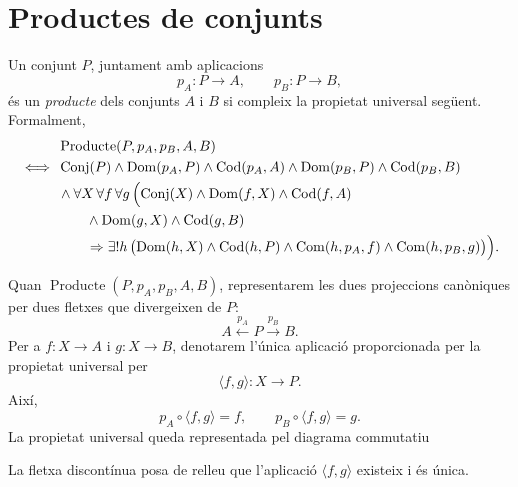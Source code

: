 \section{Productes de conjunts}\label{sec:producte}

\begin{definicio}[Producte]\label{def:producte}
Un conjunt \(P\), juntament amb aplicacions
\[
p_A:P\to A,
\qquad
p_B:P\to B,
\]
és un \emph{producte} dels conjunts \(A\) i \(B\) si compleix la propietat universal següent. Formalment,
\[
\begin{aligned}
&\operatorname{Producte}(P,p_A,p_B,A,B)
\\
\iff {}&
\operatorname{Conj}(P)
\land\operatorname{Dom}(p_A,P)\land\operatorname{Cod}(p_A,A)
\land\operatorname{Dom}(p_B,P)\land\operatorname{Cod}(p_B,B)
\\
&{}\land
\forall X\,\forall f\,\forall g\,
\Bigl(
\operatorname{Conj}(X)
\land\operatorname{Dom}(f,X)\land\operatorname{Cod}(f,A)
\\
&\qquad{}\land\operatorname{Dom}(g,X)\land\operatorname{Cod}(g,B)
\\
&\qquad{}\Rightarrow
\exists!h\,
\bigl(
\operatorname{Dom}(h,X)\land\operatorname{Cod}(h,P)
\land\operatorname{Com}(h,p_A,f)\land\operatorname{Com}(h,p_B,g)
\bigr)
\Bigr).
\end{aligned}
\]
\end{definicio}

\begin{notacio}\label{not:producte}
Quan \(\operatorname{Producte}(P,p_A,p_B,A,B)\), representarem les dues projeccions canòniques per dues fletxes que divergeixen de \(P\):
\[
A\xleftarrow{p_A}P\xrightarrow{p_B}B.
\]
Per a \(f:X\to A\) i \(g:X\to B\), denotarem l'única aplicació proporcionada per la propietat universal per
\[
\langle f,g\rangle:X\to P.
\]
Així,
\[
p_A\circ\langle f,g\rangle=f,
\qquad
p_B\circ\langle f,g\rangle=g.
\]
La propietat universal queda representada pel diagrama commutatiu
\begin{center}
\end{center}
La fletxa discontínua posa de relleu que l'aplicació \(\langle f,g\rangle\) existeix i és única.
\end{notacio}

